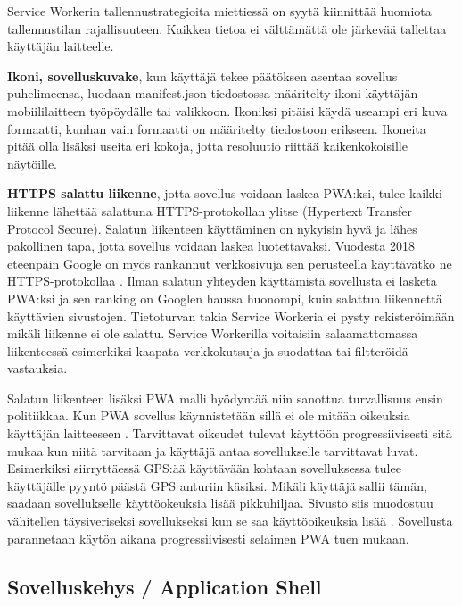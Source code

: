 \documentclass{tktltiki}
\begin{document}
Service Workerin tallennustrategioita miettiessä on syytä kiinnittää huomiota tallennustilan rajallisuuteen. Kaikkea tietoa ei välttämättä ole järkevää tallettaa käyttäjän laitteelle.

\textbf{Ikoni, sovelluskuvake}, kun käyttäjä tekee päätöksen asentaa sovellus puhelimeensa, luodaan manifest.json tiedostossa määritelty ikoni käyttäjän mobiililaitteen työpöydälle tai valikkoon. Ikoniksi pitäisi käydä useampi eri kuva formaatti, kunhan vain formaatti on määritelty tiedostoon erikseen. Ikoneita pitää olla lisäksi useita eri kokoja, jotta resoluutio riittää kaikenkokoisille näytöille.

\textbf{HTTPS salattu liikenne}, jotta sovellus voidaan laskea PWA:ksi, tulee kaikki liikenne lähettää salattuna HTTPS-protokollan ylitse (Hypertext Transfer Protocol Secure). Salatun liikenteen käyttäminen on nykyisin hyvä ja lähes pakollinen tapa, jotta sovellus voidaan laskea luotettavaksi. Vuodesta 2018 eteenpäin Google on myös rankannut verkkosivuja sen perusteella käyttävätkö ne HTTPS-protokollaa \cite{Eisworth}. Ilman salatun yhteyden käyttämistä sovellusta ei lasketa PWA:ksi ja sen ranking on Googlen haussa huonompi, kuin salattua liikennettä käyttävien sivustojen. Tietoturvan takia Service Workeria ei pysty rekisteröimään mikäli liikenne ei ole salattu. \cite{biorn2017progressive} Service Workerilla voitaisiin salaamattomassa liikenteessä esimerkiksi kaapata verkkokutsuja ja suodattaa tai filtteröidä vastauksia.

Salatun liikenteen lisäksi PWA malli hyödyntää niin sanottua turvallisuus ensin politiikkaa. Kun PWA sovellus käynnistetään sillä ei ole mitään oikeuksia käyttäjän laitteeseen \cite{8287006}. Tarvittavat oikeudet tulevat käyttöön progressiivisesti sitä mukaa kun niitä tarvitaan ja käyttäjä antaa sovellukselle tarvittavat luvat. Esimerkiksi siirryttäessä GPS:ää käyttävään kohtaan sovelluksessa tulee käyttäjälle pyyntö päästä GPS anturiin käsiksi. Mikäli käyttäjä sallii tämän, saadaan sovellukselle käyttöokeuksia lisää pikkuhiljaa. Sivusto siis muodostuu vähitellen täysiveriseksi sovellukseksi kun se saa käyttöoikeuksia lisää \cite{von2018progressive}. Sovellusta parannetaan käytön aikana progressiivisesti selaimen PWA tuen mukaan.

\subsection{Sovelluskehys / Application Shell}
\end{document}
